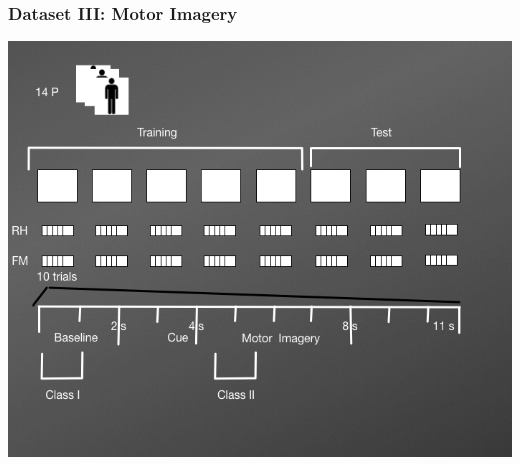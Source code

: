 \documentclass[aspectratio=169]{beamer}
\begin{document}
    
    
	\begin{frame}
	  \frametitle{Dataset III: Motor Imagery }
       \includegraphics[scale=0.38]{images/DatasetIIIDiagram2}    
    \end{frame}
   
\end{document}
